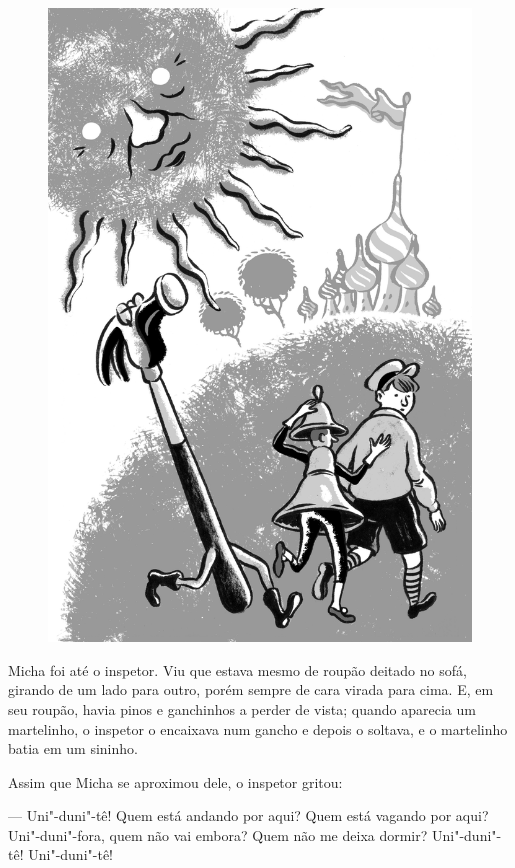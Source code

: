 \begin{figure}%
\vspace*{-2.6cm}
\hspace*{-2.75cm}\includegraphics{./imgs/cena2.jpg}
\end{figure}

Micha foi até o inspetor. Viu que estava mesmo de roupão deitado no
sofá, girando de um lado para outro, porém sempre de cara virada para
cima. E, em seu roupão, havia pinos e ganchinhos a perder de vista;
quando aparecia um martelinho, o inspetor o encaixava num gancho e
depois o soltava, e o martelinho batia em um sininho.


Assim que Micha se aproximou dele, o inspetor gritou:

--- Uni"-duni"-tê! Quem está andando por aqui? Quem está vagando por aqui?
Uni"-duni"-fora, quem não vai embora? Quem não me deixa dormir?
Uni"-duni"-tê! Uni"-duni"-tê!

